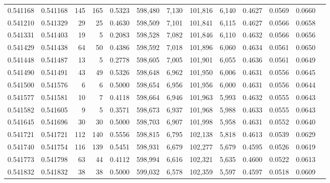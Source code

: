\begin{tabular}{rrrrrrrrrrrrr}
0.541168 & 0.541168 &   145 &   165 &                                     0.5323 & 598,480 &   7,130 & 101,816 &   6,140 & 0.4627 & 0.0569 & 0.0660 \\
0.541210 & 0.541329 &    29 &    25 &                                     0.4630 & 598,509 &   7,101 & 101,841 &   6,115 & 0.4627 & 0.0566 & 0.0658 \\
0.541331 & 0.541403 &    19 &     5 &                                     0.2083 & 598,528 &   7,082 & 101,846 &   6,110 & 0.4632 & 0.0566 & 0.0656 \\
0.541429 & 0.541438 &    64 &    50 &                                     0.4386 & 598,592 &   7,018 & 101,896 &   6,060 & 0.4634 & 0.0561 & 0.0650 \\
0.541448 & 0.541487 &    13 &     5 &                                     0.2778 & 598,605 &   7,005 & 101,901 &   6,055 & 0.4636 & 0.0561 & 0.0649 \\
0.541490 & 0.541491 &    43 &    49 &                                     0.5326 & 598,648 &   6,962 & 101,950 &   6,006 & 0.4631 & 0.0556 & 0.0645 \\
0.541500 & 0.541576 &     6 &     6 &                                     0.5000 & 598,654 &   6,956 & 101,956 &   6,000 & 0.4631 & 0.0556 & 0.0644 \\
0.541577 & 0.541581 &    10 &     7 &                                     0.4118 & 598,664 &   6,946 & 101,963 &   5,993 & 0.4632 & 0.0555 & 0.0643 \\
0.541582 & 0.541605 &     9 &     5 &                                     0.3571 & 598,673 &   6,937 & 101,968 &   5,988 & 0.4633 & 0.0555 & 0.0643 \\
0.541645 & 0.541696 &    30 &    30 &                                     0.5000 & 598,703 &   6,907 & 101,998 &   5,958 & 0.4631 & 0.0552 & 0.0640 \\
0.541721 & 0.541721 &   112 &   140 &                                     0.5556 & 598,815 &   6,795 & 102,138 &   5,818 & 0.4613 & 0.0539 & 0.0629 \\
0.541740 & 0.541754 &   116 &   139 &                                     0.5451 & 598,931 &   6,679 & 102,277 &   5,679 & 0.4595 & 0.0526 & 0.0619 \\
0.541773 & 0.541798 &    63 &    44 &                                     0.4112 & 598,994 &   6,616 & 102,321 &   5,635 & 0.4600 & 0.0522 & 0.0613 \\
0.541832 & 0.541832 &    38 &    38 &                                     0.5000 & 599,032 &   6,578 & 102,359 &   5,597 & 0.4597 & 0.0518 & 0.0609 \\

\end{tabular}
